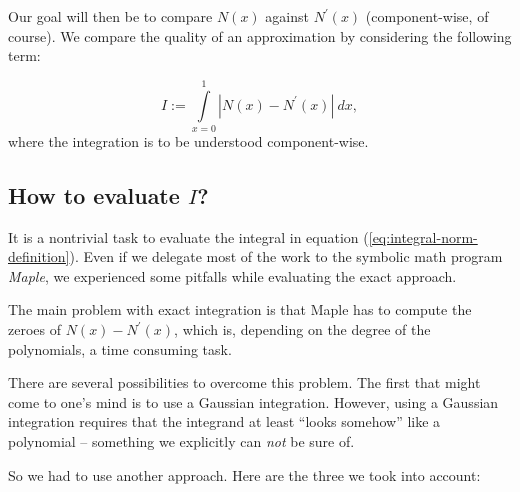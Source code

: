 \documentclass{article}
\begin{document}
Our goal will then be to compare $N\left(x\right)$ against $N^\prime\left(x\right)$ (component-wise, of course). We compare the quality of an approximation by considering the following term:

\begin{equation}
  \label{eq:integral-norm-definition}
  I := \int\limits_{x=0}^1 | N\left(x\right) - N^\prime\left(x\right) |\  dx,
\end{equation}
where the integration is to be understood component-wise.

\subsection{How to evaluate $I$?}
\label{sec:how-to-eval-I}

It is a nontrivial task to evaluate the integral in equation (\ref{eq:integral-norm-definition}). Even if we delegate most of the work to the symbolic math program \emph{Maple}, we experienced some pitfalls while evaluating the exact approach.

The main problem with exact integration is that Maple has to compute the zeroes of $N\left(x\right)-N^\prime\left(x\right)$, which is, depending on the degree of the polynomials, a time consuming task.

There are several possibilities to overcome this problem. The first that might come to one's mind is to use a Gaussian integration. However, using a Gaussian integration requires that the integrand at least ``looks somehow'' like a polynomial -- something we explicitly can \emph{not} be sure of.

So we had to use another approach. Here are the three we took into account:
\end{document}
